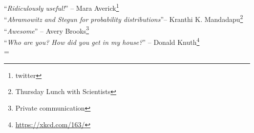 \normalstretch
{} %

~\\~\\

\noindent
``\emph{Ridiculously useful!}'' -- Mara Averick\footnote{twitter}%
\\



\noindent
``\emph{Abramowitz and Stegun for probability distributions}''-- Kranthi K. Mandadapu\footnote{Thursday Lunch with Scientists}
\\


\noindent
``\emph{Awesome}'' -- Avery Brooks\footnote{Private communication}
\\



\noindent
``\emph{Who are you? How did you get in my house?}'' -- Donald Knuth\footnote{\url{https://xkcd.com/163/}}
\\

\hbadness=\normalhbadness %
